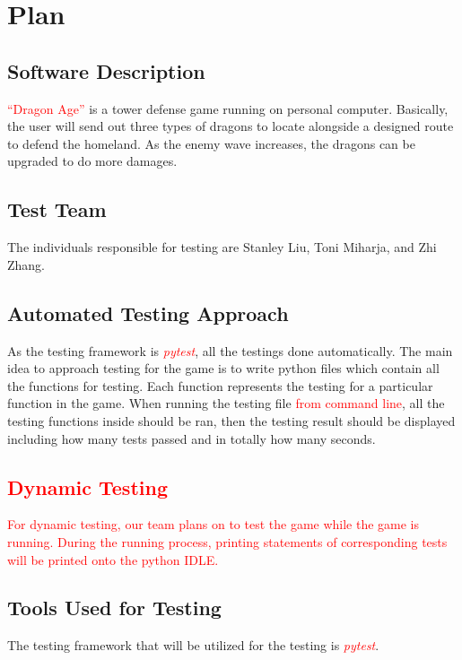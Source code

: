 \documentclass[12,english]{article}
\begin{document}
\section{Plan}
\subsection{Software Description}
\textcolor{red}{``Dragon Age''} is a tower defense game running on personal computer. Basically, the user will send out three types of dragons to locate alongside a designed route to defend the homeland. As the enemy wave increases, the dragons can be upgraded to do more damages.

\subsection{Test Team}
The individuals responsible for testing are Stanley Liu, Toni Miharja, and Zhi Zhang.

\subsection{Automated Testing Approach}
As the testing framework is \textcolor{red}{\textit{pytest}}, all the testings done automatically. The main idea to approach testing for the game is to write python files which contain all the functions for testing. Each function represents the testing for a particular function in the game. When running the testing file \textcolor{red}{from command line}, all the testing functions inside should be ran, then the testing result should be displayed including how many tests passed and in totally how many seconds.

\subsection{\textcolor{red}{Dynamic Testing}}
\textcolor{red}{For dynamic testing, our team plans on to test the game while the game is running. During the running process, printing statements of corresponding tests will be printed onto the python IDLE.}


\subsection{Tools Used for Testing}
The testing framework that will be utilized for the testing is \textcolor{red}{\textit{pytest}}.
\end{document}
